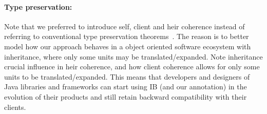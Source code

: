 \paragraph{Type preservation:}
Note that we preferred to introduce self, client and heir coherence instead of referring to conventional
type preservation theorems~\cite{}. The reason is
to better model how our approach behaves in a object oriented software ecosystem with inheritance,
where only some units may be translated/expanded.
Note inheritance crucial influence in heir coherence, and how client coherence allows
for only some units to be translated/expanded.
This means that developers and designers of Java libraries and frameworks
can start using IB (and our \mixin annotation) in the evolution of their products
and still retain backward compatibility with their clients.


\begin{comment}
\begin{figure}[tbp]
\centering
\texttt{[image: screenshot.png]}
\caption{Screenshot.}\label{screenshot_png}
\end{figure}

\haoyuan{I tried to understand the current algorithm, and did more experiments in eclipse.
Now I borrow some ideas from the current version, and give a new version of the algorithm in text. See below.

(1) I guess the function \textsf{tops} is not necessary. The first step is still
\[\textsf{mbody}(m,C_i)\in\overline{meth}\textrm{ (excluding \textbf{static} methods)}\]

(2) Assume the context is ``interface $C_0$ extends $\overline{C}$ \{$meth'$;...\}''. First handle
\[\textsf{override}(meth',\overline{meth}) \eqno{(*)}\]

(3) If $meth'\ne\none$, $(*)$ returns $meth'$ if
\[\forall meth\in\overline{meth},meth'\subtype meth\]
even if there are conflicts in $\overline{meth}$.

(4) If $meth'=\none$, we need to figure out
\[\textsf{mostSpecific}(\overline{meth})\]
and it should be the one that ``overrides'' all the others in $\overline{meth}$. It means we should not only deal with the return types of methods, but also look into the subtyping relation of interfaces. But for abstract methods, only return types are taken into consideration.
}
\end{comment}

